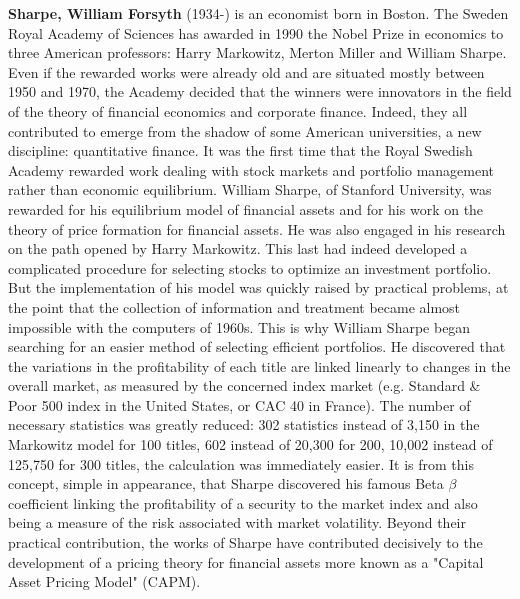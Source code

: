 \textbf{Sharpe, William Forsyth} (1934-) is an economist born in Boston. The Sweden Royal Academy of Sciences has awarded in 1990 the Nobel Prize in economics to three American professors: Harry Markowitz, Merton Miller and William Sharpe. Even if the rewarded works were already old and are situated mostly between 1950 and 1970, the Academy decided that the winners were innovators in the field of the theory of financial economics and corporate finance. Indeed, they all contributed to emerge from the shadow of some American universities, a new discipline: quantitative finance. It was the first time that the Royal Swedish Academy rewarded work dealing with stock markets and portfolio management rather than economic equilibrium. William Sharpe, of Stanford University, was rewarded for his equilibrium model of financial assets and for his work on the theory of price formation for financial assets. He was also engaged in his research on the path opened by Harry Markowitz. This last had indeed developed a complicated procedure for selecting stocks to optimize an investment portfolio. But the implementation of his model was quickly raised by practical problems, at the point that the collection of information and treatment became almost impossible with the computers of 1960s. This is why William Sharpe began searching for an easier method of selecting efficient portfolios. He discovered that the variations in the profitability of each title are linked linearly to changes in the overall market, as measured by the concerned index market (e.g. Standard \& Poor 500 index in the United States, or CAC 40 in France). The number of necessary statistics was greatly reduced: 302 statistics instead of 3,150 in the Markowitz model for 100 titles, 602 instead of 20,300 for 200, 10,002 instead of 125,750 for 300 titles, the calculation was immediately easier. It is from this concept, simple in appearance, that Sharpe discovered his famous Beta $\beta$ coefficient linking the profitability of a security to the market index and also being a measure of the risk associated with market volatility. Beyond their practical contribution, the works of Sharpe have contributed decisively to the development of a pricing theory for financial assets more known as a "Capital Asset Pricing Model" (CAPM).

